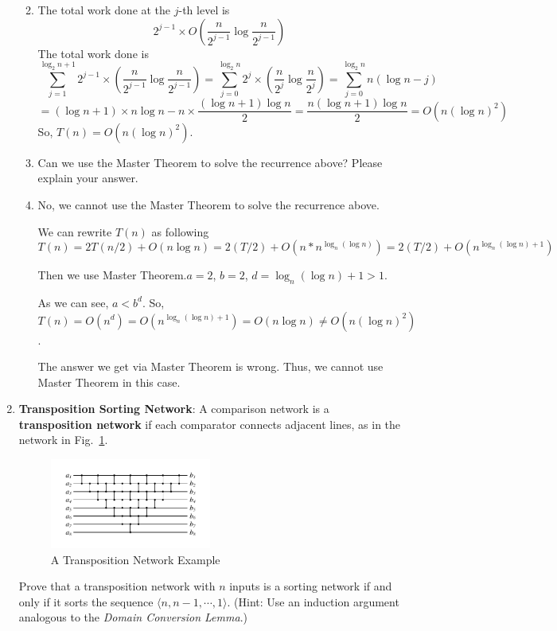 \documentclass[12pt,a4paper]{article}
\makeatletter
\newtheorem*{solution}{Solution}
\theoremstyle{definition}
\renewenvironment{solution}[1][Solution] {\par\pushQED{\qed}\normalfont\topsep6\p@\@plus6\p@\relax\trivlist\item[\hskip\labelsep\bfseries#1\@addpunct{.}]\ignorespaces}{\popQED\endtrivlist\@endpefalse} \makeatother
\makeatother
\begin{document}
\begin{enumerate}
\begin{enumerate}
\begin{solution}
The total work done at the $j$-th level is
$$2^{j-1}\times O\left(\frac{n}{2^{j-1}}\log\frac{n}{2^{j-1}}\right)$$
The total work done is
$$\sum\limits_{j=1}^{\log_2n+1}2^{j-1}\times\left(\frac{n}{2^{j-1}}\log\frac{n}{2^{j-1}}\right)
=\sum\limits_{j=0}^{\log_2n}2^{j}\times\left(\frac{n}{2^{j}}\log\frac{n}{2^{j}}\right)
=\sum\limits_{j=0}^{\log_2n}n(\log n-j)$$
$$=(\log n+1)\times n\log n-n\times\frac{(\log n+1)\log n}{2}=\frac{n(\log n+1)\log n}{2}=O(n(\log n)^2)$$
So, $T(n)=O(n(\log n)^2)$.
\end{solution}
\item
{\color{red}{(Optional Sub-question with Bonus)}} Can we use the Master Theorem to solve the recurrence above? Please explain your answer.
\begin{solution}
No, we cannot use the Master Theorem to solve the recurrence above.

We can rewrite $T(n)$ as following
$$T(n)=2T(n/2)+O(n\log n)=2(T/2)+O(n*n^{\log_n(\log n)})=2(T/2)+O(n^{\log_n(\log n)+1})$$

Then we use Master Theorem.$a=2$, $b=2$, $d=\log_n(\log n)+1>1$.

As we can see, $a<b^d$. So, $T(n)=O(n^d)=O(n^{\log_n(\log n)+1})=O(n\log n)\neq O(n(\log n)^2)$.

The answer we get via Master Theorem is wrong. Thus, we cannot use Master Theorem in this case.
\end{solution}
\end{enumerate}

\item
\textbf{Transposition Sorting Network}: A comparison network is a \textbf{transposition network}  if each comparator connects adjacent lines, as in the network in Fig.~\ref{Fig-Transposition}.

\begin{figure}[htbp]
    \centering
    \includegraphics[width=0.5\textwidth]{Fig-Transposition.pdf}
    \caption{A Transposition Network Example}\label{Fig-Transposition}
\end{figure}

Prove that a transposition network with $n$ inputs is a sorting network if and only if it sorts the sequence $\langle n, n-1, \cdots, 1 \rangle$. {\color{blue}(Hint: Use an induction argument analogous to the \emph{Domain Conversion Lemma}.)}


\end{enumerate}
\end{document}
